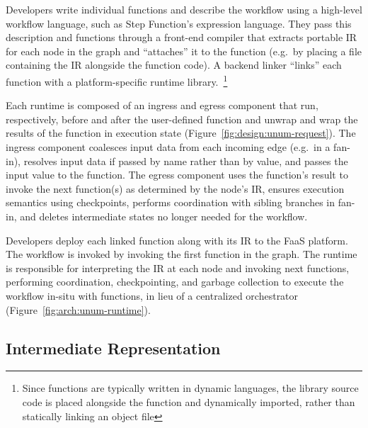 Developers write individual functions and describe the workflow using a
high-level workflow language, such as Step Function's expression language. They
pass this description and functions through a front-end \name{} compiler that
extracts portable \name{} IR for each node in the graph and ``attaches'' it to
the function (e.g.\ by placing a file containing the IR alongside the function
code). A backend \name{} linker ``links'' each function with a
platform-specific \name{} runtime library.~\footnote{Since functions are
typically written in dynamic languages, the \name{} library source code is
placed alongside the function and dynamically imported, rather than statically
linking an object file}

Each runtime is composed of an ingress and egress component that run,
respectively, before and after the user-defined function and unwrap and wrap the
results of the function in \name{} execution state
(Figure~\ref{fig:design:unum-request}). The ingress component coalesces input
data from each incoming edge (e.g.\ in a fan-in), resolves input data if passed
by name rather than by value, and passes the input value to the function. The
egress component uses the function's result to invoke the next function(s) as
determined by the node's IR, ensures execution semantics using checkpoints,
performs coordination with sibling branches in fan-in, and deletes intermediate
states no longer needed for the workflow.

Developers deploy each linked function along with its IR to the FaaS platform.
The workflow is invoked by invoking the first function in the graph.  The
\name{} runtime is responsible for interpreting the \name{} IR at each node and
invoking next functions, performing coordination, checkpointing, and garbage
collection to execute the workflow in-situ with functions, in lieu of a
centralized orchestrator (Figure~\ref{fig:arch:unum-runtime}).

\subsection{\name{} Intermediate Representation}\label{sec:design:ir}

